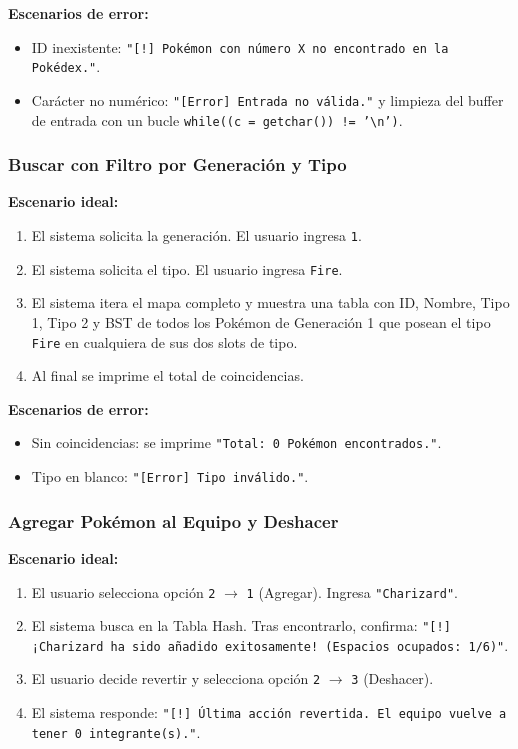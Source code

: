 \documentclass[12pt, letterpaper]{article}
\begin{document}
\textbf{Escenarios de error:}
\begin{itemize}
    \item ID inexistente: \texttt{"[!] Pokémon con número X no encontrado en la Pokédex."}.
    \item Carácter no numérico: \texttt{"[Error] Entrada no válida."} y limpieza del buffer de entrada con un bucle \texttt{while((c = getchar()) != '\textbackslash{}n')}.
\end{itemize}

\subsubsection{Buscar con Filtro por Generación y Tipo}

\textbf{Escenario ideal:}
\begin{enumerate}
    \item El sistema solicita la generación. El usuario ingresa \texttt{1}.
    \item El sistema solicita el tipo. El usuario ingresa \texttt{Fire}.
    \item El sistema itera el mapa completo y muestra una tabla con ID, Nombre, Tipo 1, Tipo 2 y BST de todos los Pokémon de Generación 1 que posean el tipo \texttt{Fire} en cualquiera de sus dos slots de tipo.
    \item Al final se imprime el total de coincidencias.
\end{enumerate}

\textbf{Escenarios de error:}
\begin{itemize}
    \item Sin coincidencias: se imprime \texttt{"Total: 0 Pokémon encontrados."}.
    \item Tipo en blanco: \texttt{"[Error] Tipo inválido."}.
\end{itemize}

\subsubsection{Agregar Pokémon al Equipo y Deshacer}

\textbf{Escenario ideal:}
\begin{enumerate}
    \item El usuario selecciona opción \texttt{2} $\rightarrow$ \texttt{1} (Agregar). Ingresa \texttt{"Charizard"}.
    \item El sistema busca en la Tabla Hash. Tras encontrarlo, confirma: \texttt{"[!] ¡Charizard ha sido añadido exitosamente! (Espacios ocupados: 1/6)"}.
    \item El usuario decide revertir y selecciona opción \texttt{2} $\rightarrow$ \texttt{3} (Deshacer).
    \item El sistema responde: \texttt{"[!] Última acción revertida. El equipo vuelve a tener 0 integrante(s)."}.
\end{enumerate}
\end{document}
